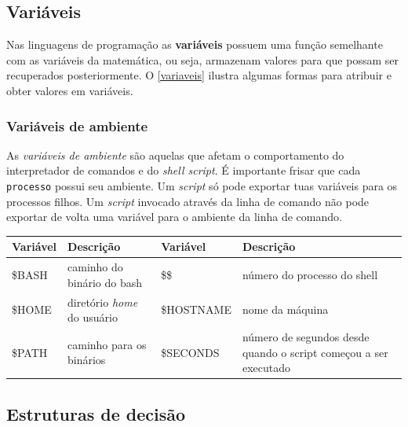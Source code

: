 \documentclass[11pt]{ifscarticle}
\begin{document}
\subsection{Variáveis}

Nas linguagens de programação as \textbf{variáveis} possuem uma função semelhante com as variáveis da matemática, ou seja, armazenam valores para que possam ser recuperados posteriormente. O \autoref{variaveis} ilustra algumas formas para atribuir e obter valores em variáveis.








\subsubsection{Variáveis de ambiente}

As \textit{variáveis de ambiente} são aquelas que afetam o comportamento do interpretador de comandos e do \textit{shell script}. É importante frisar que cada \texttt{processo} possui seu ambiente. Um \textit{script} só pode exportar tuas variáveis para os processos filhos. Um \textit{script} invocado através da linha de comando não pode exportar de volta uma variável para o ambiente da linha de comando.

\begin{table}[!htpb]
\begin{center}
\begin{tabular}{lp{5cm}lp{5cm}}\toprule
\textbf{Variável} & \textbf{Descrição}  & \textbf{Variável} & \textbf{Descrição} \\ \midrule
\$BASH & caminho do binário do bash & \$\$ & número do processo do shell\\ 
\$HOME & diretório \textit{home} do usuário & \$HOSTNAME & nome da máquina\\ 
\$PATH & caminho para os binários & \$SECONDS & número de segundos desde quando o script começou a ser executado\\ \bottomrule

\end{tabular}
\end{center}
\end{table}


\subsection{Estruturas de decisão}
\end{document}
